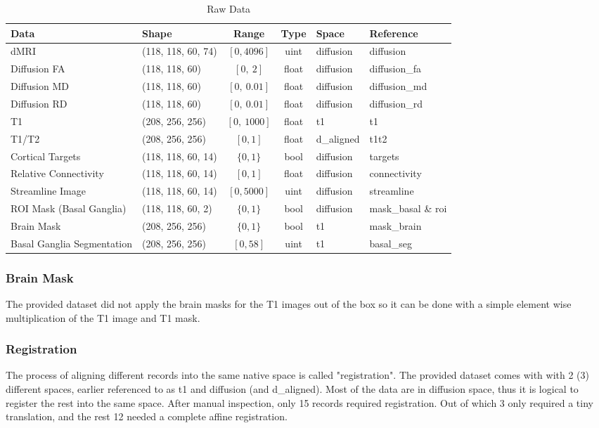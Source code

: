 \begin{table}[H]
\centering
\begin{tabular}{|l|l|c|c|l|l|}
\hline
\textbf{Data} & \textbf{Shape} & \textbf{Range} & \textbf{Type} & \textbf{Space} & \textbf{Reference} \\ \hline
\ac{dMRI} & (118, 118, 60, 74) & $[0,4096]$ & uint & diffusion & diffusion \\ \hline
Diffusion \ac{FA} & (118, 118, 60) & $[0,~2]$ & float & diffusion & diffusion\_fa \\ \hline
Diffusion \ac{MD} & (118, 118, 60) & $[0,~0.01]$ & float & diffusion & diffusion\_md \\ \hline
Diffusion \ac{RD} & (118, 118, 60) & $[0,~0.01]$ & float & diffusion & diffusion\_rd \\ \hline
T1 & (208, 256, 256) & $[0,~1000]$ & float & t1 & t1 \\ \hline
T1/T2 & (208, 256, 256) & $[0,1]$ & float & d\_aligned & t1t2 \\ \hline
Cortical Targets & (118, 118, 60, 14) & $\{0,1\}$ & bool & diffusion & targets \\ \hline
Relative Connectivity & (118, 118, 60, 14) & $[0,1]$ & float & diffusion & connectivity \\ \hline
Streamline Image & (118, 118, 60, 14) & $[0,5000]$ & uint & diffusion & streamline \\ \hline
\ac{ROI} Mask (Basal Ganglia) & (118, 118, 60, 2) & $\{0,1\}$ & bool & diffusion & mask\_basal \& roi \\ \hline
Brain Mask & (208, 256, 256) & $\{0,1\}$ & bool & t1 & mask\_brain \\ \hline
Basal Ganglia Segmentation & (208, 256, 256) & $[0, 58]$ & uint & t1 & basal\_seg \\ \hline
\end{tabular}
\caption{Raw Data}
\label{tab:datas1}
\end{table}

\subsubsection{Brain Mask}
The provided dataset did not apply the brain masks for the T1 images out of the box so it can be done with a simple element wise multiplication of the T1 image and T1 mask.

\subsubsection{Registration}
The process of aligning different records into the same native space is called "registration". The provided dataset comes with with 2 (3) different spaces, earlier referenced to as t1 and diffusion (and d\_aligned). Most of the data are in diffusion space, thus it is logical to register the rest into the same space. After manual inspection, only 15 records required registration. Out of which 3 only required a tiny translation, and the rest 12 needed a complete affine registration.\par

